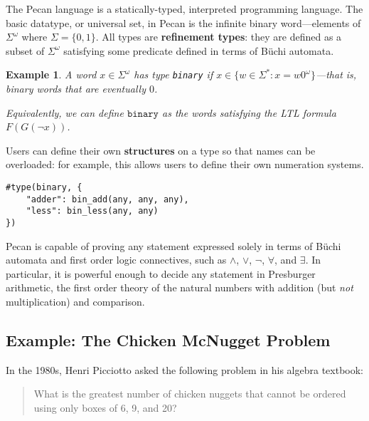 \documentclass[landscape,usenames,dvipsnames]{sciposter}
\newtheorem*{ex}{Example}
\begin{document}
\begin{multicols}{3}
\begin{itemize}
\end{itemize}

The Pecan language is a statically-typed, interpreted programming language.
The basic datatype, or universal set, in Pecan is the infinite binary word---elements of $\Sigma^{\omega}$ where $\Sigma = \{0,1\}$.
All types are \textbf{refinement types}: they are defined as a subset of $\Sigma^{\omega}$ satisfying some predicate defined in terms of B\"uchi automata.

\begin{ex}
A word $x \in \Sigma^\omega$ has type \texttt{binary} if $x \in \{ w \in \Sigma^* : x = w0^\omega \}$---that is, binary words that are eventually $0$.

Equivalently, we can define $\texttt{binary}$ as the words satisfying the LTL formula $F(G(\neg x))$.
\end{ex}

Users can define their own \textbf{structures} on a type so that names can be overloaded: for example, this allows users to define their own numeration systems.

\begin{lstlisting}[language=pecan, basicstyle=\normalsize\ttfamily, mathescape=true, frame=single]
#type(binary, {
    "adder": bin_add(any, any, any),
    "less": bin_less(any, any) 
})
\end{lstlisting}

Pecan is capable of proving any statement expressed solely in terms of B\"uchi automata and first order logic connectives, such as $\wedge$, $\vee$, $\neg$, $\forall$, and $\exists$.
In particular, it is powerful enough to decide any statement in Presburger arithmetic, the first order theory of the natural numbers with addition (but \emph{not} multiplication) and comparison.

\begin{mdframed}[style=MyFrame]
\subsection*{Example: The Chicken McNugget Problem }
\end{mdframed}

In the 1980s, Henri Picciotto asked the following problem in his algebra textbook:

\begin{quote}
    What is the greatest number of chicken nuggets that cannot be ordered using only boxes of 6, 9, and 20?
\end{quote}


\end{multicols}
\end{document}
